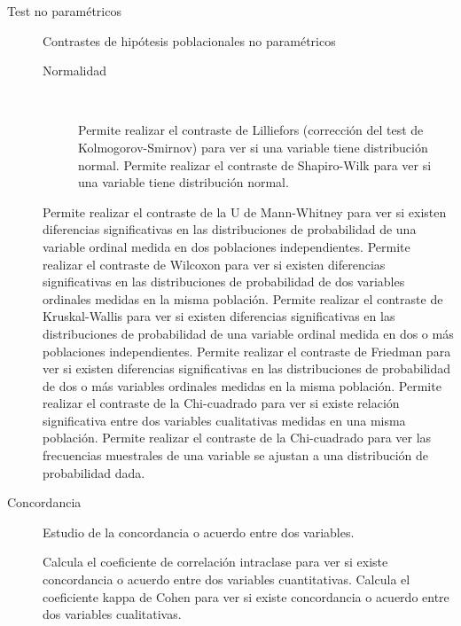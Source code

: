 \documentclass[10pt,twoside,spanish]{article}
\numberwithin{equation}{section}
\begin{document}
\begin{description}
\item[Test no paramétricos] Contrastes de hipótesis poblacionales no paramétricos
\begin{description}
\item[Normalidad]\hfill\\[-1\baselineskip]
\begin{itemize}
 Permite realizar el contraste de Lilliefors (corrección del test de Kolmogorov-Smirnov) para
ver si una variable tiene distribución normal. 
 Permite realizar el contraste de Shapiro-Wilk para ver si una variable tiene
distribución normal. 
\end{itemize}
\end{description}
\begin{itemize}
 Permite realizar el contraste de la U de Mann-Whitney para ver si existen
diferencias significativas en las distribuciones de probabilidad de una variable ordinal medida en dos poblaciones independientes.   
 Permite realizar el contraste de Wilcoxon para ver si existen
diferencias significativas en las distribuciones de probabilidad de dos variables ordinales medidas en la misma población. 
 Permite realizar el contraste de Kruskal-Wallis para ver si existen
diferencias significativas en las distribuciones de probabilidad de una variable ordinal medida en dos o más poblaciones independientes.
 Permite realizar el contraste de Friedman para ver si existen
diferencias significativas en las distribuciones de probabilidad de dos o más variables ordinales medidas en la misma población. 
 Permite realizar el contraste de la Chi-cuadrado para ver si existe relación significativa entre
dos variables cualitativas medidas en una misma población. 
 Permite realizar el contraste de la Chi-cuadrado para ver las frecuencias muestrales de una
variable se ajustan a una distribución de probabilidad dada. 
\end{itemize}

\item[Concordancia] Estudio de la concordancia o acuerdo entre dos variables. 
\begin{itemize}
 Calcula el coeficiente de correlación intraclase para ver si existe concordancia o acuerdo
entre dos variables cuantitativas. 
 Calcula el coeficiente kappa de Cohen para ver si existe concordancia o acuerdo entre dos variables cualitativas.  
\end{itemize}


\end{description}
\end{document}
